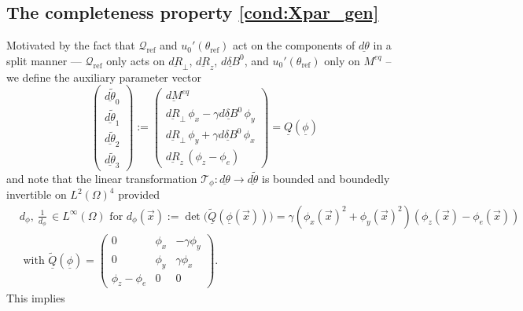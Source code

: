 \documentclass[12pt]{article}
\newcommand\uld[1]{\underline{d#1}}
\newcommand\hrefprime{\mathcal{Q}_{\text{ref}}}
\newcommand\vecr{\vec{x}}
\newcommand\ulQ{\underline{Q}}
\begin{document}
\subsection{The completeness property \eqref{cond:Xpar_gen}} 

Motivated by the fact that $\hrefprime$ and $u_0'(\theta_{\text{ref}})$ act on the components of $\uld{\theta}$ in a split manner --- $\hrefprime$ only acts on $\uld{R}_\perp$, $\uld{R}_z$, $\uld{\delta B}^0$, and $u_0'(\theta_{\text{ref}})$ only on $M^{eq}$ -- we define the auxiliary parameter vector
\[
\begin{pmatrix}
\uld{\tilde{\theta}}_0\\
\uld{\tilde{\theta}}_1\\
\uld{\tilde{\theta}}_2\\
\uld{\tilde{\theta}}_3
\end{pmatrix}
:= \begin{pmatrix}
\uld{M}^{eq}\\
\uld{R}_\perp\,\phi_x-\gamma\uld{\delta B}^0\,\phi_y\\
\uld{R}_\perp\,\phi_y+\gamma\uld{\delta B}^0\,\phi_x\\
\uld{R}_z\,(\phi_z-\phi_e)
\end{pmatrix}
=\ulQ(\underline{\phi})
\]
and note that the linear transformation $\mathcal{T}_\phi:\uld{\theta}\to\uld{\tilde{\theta}}$ is bounded and boundedly invertible on $L^2(\Omega)^4$
provided 
\begin{equation}\label{detnonzero}
\begin{aligned}
&d_\phi, \ \tfrac{1}{d_\phi}\, \in L^\infty(\Omega)\text{ for }
d_\phi(\vecr):=\det\bigl(\tilde{\ulQ}(\underline{\phi}(\vecr))\bigr)
=\gamma(\phi_x(\vecr)^2+\phi_y(\vecr)^2)(\phi_z(\vecr)-\phi_e(\vecr))
\\&\text{ with }
\tilde{\ulQ}(\underline{\phi})
=\begin{pmatrix}
0&\phi_x&-\gamma \phi_y\\
0&\phi_y&\gamma \phi_x\\
\phi_z-\phi_e&0&0
\end{pmatrix}.
\end{aligned}
\end{equation}
This implies 
\end{document}
